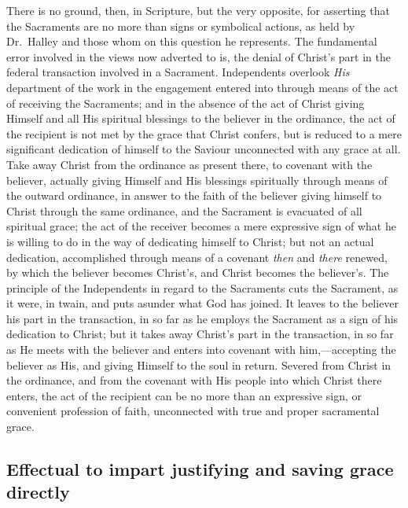 \documentclass[]{book}
\begin{document}
There is no ground, then, in Scripture, but the very opposite, for asserting that the Sacraments are no more than signs or symbolical actions, as held by Dr.~Halley and those whom on this question he represents. The fundamental error involved in the views now adverted to is, the denial of Christ's part in the federal transaction involved in a Sacrament. Independents overlook \emph{His} department of the work in the engagement entered into through means of the act of receiving the Sacraments; and in the absence of the act of Christ giving Himself and all His spiritual blessings to the believer in the ordinance, the act of the recipient is not met by the grace that Christ confers, but is reduced to a mere significant dedication of himself to the Saviour unconnected with any grace at all. Take away Christ from the ordinance as present there, to covenant with the believer, actually giving Himself and His blessings spiritually through means of the outward ordinance, in answer to the faith of the believer giving himself to Christ through the same ordinance, and the Sacrament is evacuated of all spiritual grace; the act of the receiver becomes a mere expressive sign of what he is willing to do in the way of dedicating himself to Christ; but not an actual dedication, accomplished through means of a covenant \emph{then} and \emph{there} renewed, by which the believer becomes Christ's, and Christ becomes the believer's. The principle of the Independents in regard to the Sacraments cuts the Sacrament, as it were, in twain, and puts asunder what God has joined. It leaves to the believer his part in the transaction, in so far as he employs the Sacrament as a sign of his dedication to Christ; but it takes away Christ's part in the transaction, in so far as He meets with the believer and enters into covenant with him,---accepting the believer as His, and giving Himself to the soul in return. Severed from Christ in the ordinance, and from the covenant with His people into which Christ there enters, the act of the recipient can be no more than an expressive sign, or convenient profession of faith, unconnected with true and proper sacramental grace.

\hypertarget{effectual-to-impart-justifying-and-saving-grace-directly}{%
\subsection{Effectual to impart justifying and saving grace directly}\label{effectual-to-impart-justifying-and-saving-grace-directly}}
\end{document}

